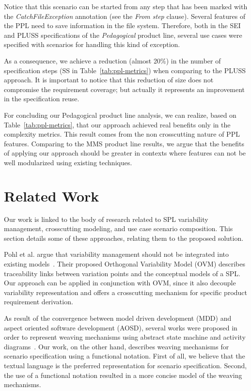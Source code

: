 \documentclass{acm_proc_article-sp}
\begin{document}
Notice that this scenario can be started from any step that has been marked with
the \emph{CatchFileException} annotation (see the \emph{From step} clause).
Several features of the PPL need to save information in the file system.
Therefore, both in the SEI and PLUSS specifications of the \emph{Pedagogical}
product line, several use cases were specified with scenarios for handling this
kind of exception.

As a consequence, we achieve a reduction (almost 20\%) in the number of
specification steps (SS in Table~\ref{tab:ppl-metrics}) when comparing to the
PLUSS approach. It is important to notice that this reduction of size does not
compromise the requirement coverage; but actually it represents an improvement in
the specification reuse.

For concluding our Pedagogical product line analysis, we can realize, based on
Table~\ref{tab:ppl-metrics}, that our approach achieved real benefits only in the
complexity metrics. This result comes from the non crosscutting nature of PPL
features. Comparing to the MMS product line results, we argue that the benefits
of applying our approach should be greater in contexts where features can not be
well modularized using existing techniques.
   
\section{Related Work}
\label{sec:related}

Our work is linked to the body of research related to SPL
variability management, crosscutting modeling, and use case scenario
composition. This section details some of these approaches, relating
them to the proposed solution.

Pohl et al. argue that variability management should not be
integrated into existing models~\cite{phol-spl-book}. Their proposed
Orthogonal Variability Model (OVM) describes traceability links
between variation points and the conceptual models of a SPL. Our
approach can be applied in conjunction with OVM, since it also
decouple variability representation and offers a crosscutting
mechanism for specific product requirement derivation.

As result of the convergence between model driven development (MDD)
and aspect oriented software development (AOSD), several works were
proposed in order to represent weaving mechanisms using abstract
state machine and activity
diagrams~\cite{noda-aom-2006,thomas-aom-2006}. Our work, on the
other hand, describes weaving mechanisms for scenario specification
using a functional notation. First of all, we believe that the
textual language is the preferred representation for scenario
specification. Second, the use of a functional notation resulted in
a more concise model of the weaving mechanisms.
\end{document}
